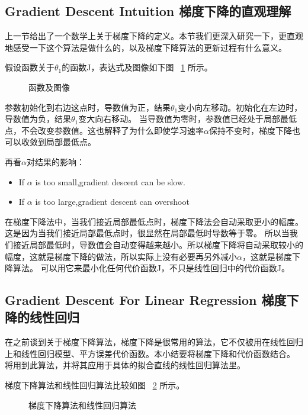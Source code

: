 \documentclass[UTF8]{ctexart}
\begin{document}
\subsection{Gradient Descent Intuition 梯度下降的直观理解}
上一节给出了一个数学上关于梯度下降的定义。本节我们更深入研究一下，更直观地感受一下这个算法是做什么的，以及梯度下降算法的更新过程有什么意义。

假设函数关于$\theta_1$的函数J，表达式及图像如下图 ~\ref{fig:6} 所示。

\begin{figure}[htb]
 \caption{函数及图像}
 \label{fig:6}
\end{figure}

参数初始化到右边这点时，导数值为正，结果$\theta_1$变小向左移动。初始化在左边时，导数值为负，结果$\theta_1$变大向右移动。
当导数值为零时，参数值已经处于局部最低点，不会改变参数值。这也解释了为什么即使学习速率$\alpha$保持不变时，梯度下降也可以收敛到局部最低点。
\newline

再看$\alpha$对结果的影响：
\begin{itemize}
  \item If $\alpha$ is too small,gradient descent can be slow.
  \item If $\alpha$ is too large,gradient descent can overshoot
\end{itemize}

在梯度下降法中，当我们接近局部最低点时，梯度下降法会自动采取更小的幅度。这是因为当我们接近局部最低点时，很显然在局部最低时导数等于零。
所以当我们接近局部最低时，导数值会自动变得越来越小。所以梯度下降将自动采取较小的幅度，这就是梯度下降的做法，所以实际上没有必要再另外减小$\alpha$，这就是梯度下降算法。
可以用它来最小化任何代价函数J，不只是线性回归中的代价函数J。

\subsection{Gradient Descent For Linear Regression 梯度下降的线性回归}
在之前谈到关于梯度下降算法，梯度下降是很常用的算法，它不仅被用在线性回归上和线性回归模型、平方误差代价函数。本小结要将梯度下降和代价函数结合。
将用到此算法，并将其应用于具体的拟合直线的线性回归算法里。

梯度下降算法和线性回归算法比较如图 ~\ref{fig:7} 所示。
\begin{figure}[htb]
 \caption{梯度下降算法和线性回归算法}
 \label{fig:7}
\end{figure}
\end{document}
